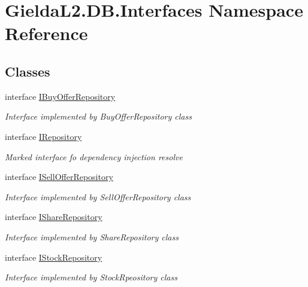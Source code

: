 \hypertarget{namespace_gielda_l2_1_1_d_b_1_1_interfaces}{}\section{Gielda\+L2.\+D\+B.\+Interfaces Namespace Reference}
\label{namespace_gielda_l2_1_1_d_b_1_1_interfaces}
\subsection*{Classes}
\begin{DoxyCompactItemize}
\item 
interface \mbox{\hyperlink{interface_gielda_l2_1_1_d_b_1_1_interfaces_1_1_i_buy_offer_repository}{I\+Buy\+Offer\+Repository}}
\begin{DoxyCompactList}\small\item\em Interface implemented by Buy\+Offer\+Repository class \end{DoxyCompactList}\item 
interface \mbox{\hyperlink{interface_gielda_l2_1_1_d_b_1_1_interfaces_1_1_i_repository}{I\+Repository}}
\begin{DoxyCompactList}\small\item\em Marked interface fo dependency injection resolve \end{DoxyCompactList}\item 
interface \mbox{\hyperlink{interface_gielda_l2_1_1_d_b_1_1_interfaces_1_1_i_sell_offer_repository}{I\+Sell\+Offer\+Repository}}
\begin{DoxyCompactList}\small\item\em Interface implemented by Sell\+Offer\+Repository class \end{DoxyCompactList}\item 
interface \mbox{\hyperlink{interface_gielda_l2_1_1_d_b_1_1_interfaces_1_1_i_share_repository}{I\+Share\+Repository}}
\begin{DoxyCompactList}\small\item\em Interface implemented by Share\+Repository class \end{DoxyCompactList}\item 
interface \mbox{\hyperlink{interface_gielda_l2_1_1_d_b_1_1_interfaces_1_1_i_stock_repository}{I\+Stock\+Repository}}
\begin{DoxyCompactList}\small\item\em Interface implemented by Stock\+Rpeository class \end{DoxyCompactList}\item 

\end{DoxyCompactItemize}
